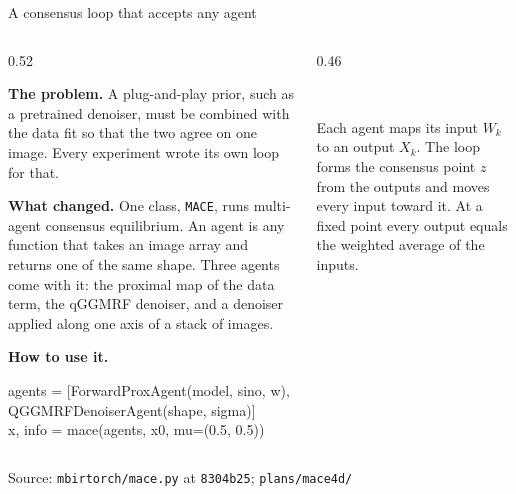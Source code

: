 \documentclass[aspectratio=169,10pt]{beamer}
\newcommand{\tagchip}[2]{{\setlength{\fboxsep}{2.5pt}\setlength{\fboxrule}{0.6pt}%
  \fcolorbox{white}{#1}{\textcolor{white}{\footnotesize\bfseries\strut #2}}}}
\newcommand{\onbranch}{\tagchip{branchAmber}{BRANCH}}
\newcommand{\source}[1]{\par\vfill{\scriptsize\textcolor{inkGray}{Source: #1}\par}}
\newcommand{\figcaption}[1]{{\scriptsize\textcolor{inkGray}{#1}\par}}
\newcommand{\head}[1]{\textbf{#1}}
\begin{document}
\begin{frame}{A consensus loop that accepts any agent \hfill \onbranch}
  \begin{columns}[T]
    \begin{column}{0.52\textwidth}
      {\small
      \head{The problem.}  A plug-and-play prior, such as a pretrained
      denoiser, must be combined with the data fit so that the two agree on
      one image.  Every experiment wrote its own loop for that.\par\vspace{6pt}
      \head{What changed.}  One class, \texttt{MACE}, runs multi-agent
      consensus equilibrium.  An agent is any function that takes an image
      array and returns one of the same shape.  Three agents come with it:
      the proximal map of the data term, the qGGMRF denoiser, and a denoiser
      applied along one axis of a stack of images.\par\vspace{6pt}
      \head{How to use it.}\par\vspace{2pt}
      {\scriptsize\ttfamily
      agents = [ForwardProxAgent(model, sino, w),\\
      \hphantom{agents = [}QGGMRFDenoiserAgent(shape, sigma)]\\
      x, info = mace(agents, x0, mu=(0.5, 0.5))\par}}
    \end{column}
    \begin{column}{0.46\textwidth}
      \centering
      \\[6pt]
      \figcaption{Each agent maps its input $W_k$ to an output $X_k$.  The
      loop forms the consensus point $z$ from the outputs and moves every
      input toward it.  At a fixed point every output equals the weighted
      average of the inputs.}
    \end{column}
  \end{columns}
  \source{\texttt{mbirtorch/mace.py} at \texttt{8304b25}; \texttt{plans/mace4d/}}
\end{frame}
\end{document}
